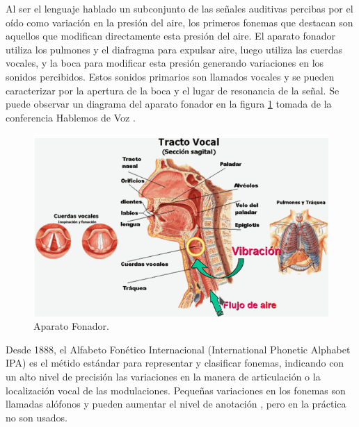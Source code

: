 Al ser el lenguaje hablado un subconjunto de las señales auditivas percibas por el oído como variación en la presión del aire, los primeros fonemas que destacan son aquellos que modifican directamente esta presión del aire. El aparato fonador utiliza los pulmones y el diafragma para expulsar aire, luego utiliza las cuerdas vocales, y la boca para modificar esta presión generando variaciones en los sonidos percibidos. Estos sonidos primarios son llamados vocales y se pueden caracterizar por la apertura de la boca y el lugar de resonancia de la señal. Se puede observar un diagrama del aparato fonador en la figura \ref{img:aparato_fonador} tomada de la conferencia Hablemos de Voz \cite{hableomsDeVoz}.

\begin{figure}[H]
\caption{Aparato Fonador.}
\label{img:aparato_fonador}
\centering
\includegraphics[width=12cm]{imagenes/03_02_aparato_fonador.png}
\end{figure}

Desde 1888, el Alfabeto Fonético Internacional (International Phonetic Alphabet IPA) es el métido estándar para representar y clasificar fonemas, indicando con un alto nivel de precisión las variaciones en la manera de articulación o la localización vocal de las modulaciones. Pequeñas variaciones en los fonemas son llamadas alófonos y pueden aumentar el nivel de anotación  \cite{IPAAlphabet}, pero en la práctica no son usados.

